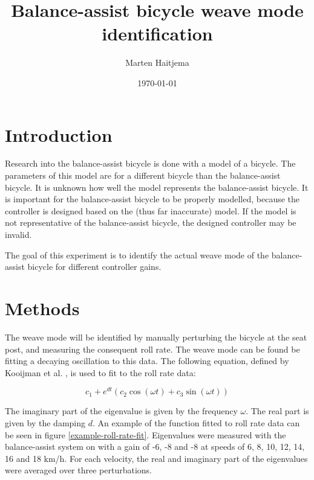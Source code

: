 \documentclass[12pt]{article}
\title{Balance-assist bicycle weave mode identification}
\author{Marten Haitjema}
\date{\today}
\begin{document}
\maketitle

\section{Introduction}
Research into the balance-assist bicycle is done with a model of a bicycle. The parameters of this
model are for a different bicycle than the balance-assist bicycle. It is unknown how well the model
represents the balance-assist bicycle. It is important for the balance-assist bicycle to be
properly modelled, because the controller is designed based on the (thus far inaccurate) model. If
the model is not representative of the balance-assist bicycle, the designed controller may be
invalid.

The goal of this experiment is to identify the actual weave mode of the balance-assist bicycle for
different controller gains.

\section{Methods}
The weave mode will be identified by manually perturbing the bicycle at the seat post, and
measuring the consequent roll rate. The weave mode can be found be fitting a decaying oscillation
to this data. The following equation, defined by Kooijman et al. \cite{Kooijman2008}, is used to
fit to the roll rate data:

\begin{equation}
    c_1 + e^{dt} (c_2\cos(\omega t) + c_3\sin(\omega t))
    \label{kooijman-func}
\end{equation}

The imaginary part of the eigenvalue is given by the frequency $\omega$. The real part is given by
the damping $d$. An example of the function fitted to roll rate data can be seen in figure
\ref{example-roll-rate-fit}. Eigenvalues were measured with the balance-assist system on with a
gain of -6, -8 and -8 at speeds of 6, 8, 10, 12, 14, 16 and 18 km/h. For each velocity, the real
and imaginary part of the eigenvalues were averaged over three perturbations.
\end{document}
